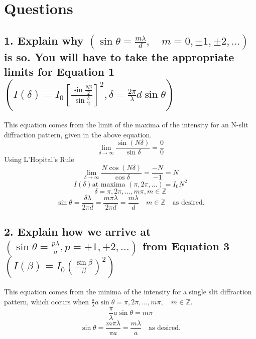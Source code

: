 \documentclass[12pt]{article}
\begin{document}
\section{Questions}
\subsection*{1. Explain why $(\sin\theta=\frac{m\lambda}{d},\quad m=0,\pm1,\pm2,\dots)$ is so. You will have to take the appropriate limits for Equation 1 $\left(I(\delta)=I_0\left[\frac{\sin\frac{N\delta}{2}}{\sin\frac{\delta}{2}}\right]^2, \delta= \frac{2\pi}{\lambda}d\sin\theta\right)$}
\noindent This equation comes from the limit of the maxima of the intensity for an N-slit diffraction pattern, given in the above equation.
\[\lim_{\delta\rightarrow\infty}\frac{\sin(N\delta)}{\sin\delta}=\frac{0}{0}\]
Using L'Hopital's Rule
\[\lim_{\delta\rightarrow\infty}\frac{N\cos(N\delta)}{\cos\delta}=\frac{-N}{-1}=N\]
\[I(\delta)\text{at maxima } (\pi,2\pi,\dots)=I_0N^2\]
\[\delta=\pi,2\pi,\dots,m\pi,  m\in \mathbb{Z}\]
\[\sin\theta=\frac{\delta\lambda}{2\pi d}=\frac{m\pi\lambda}{2\pi d}=\frac{m\lambda}{d} \quad m\in\mathbb{Z}\quad\text{as desired.}\]
\subsection*{2. Explain how we arrive at $\left(\sin\theta=\frac{p\lambda}{a}, p=\pm1,\pm2,\dots\right)$ from Equation 3 $\left(I(\beta)=I_0\left(\frac{\sin\beta}{\beta}\right)^2 \right)$}
\noindent This equation comes from the minima of the intensity for a single slit diffraction pattern, which occurs when $\frac{\pi}{\lambda}a\sin\theta=\pi,2\pi,\dots, m\pi,\quad m\in\mathbb{Z}$.
\[\frac{\pi}{\lambda}a\sin\theta=m\pi\]
\[\sin\theta=\frac{m\pi\lambda}{\pi a}=\frac{m\lambda}{a}\quad\text{as desired.}\]
\end{document}
